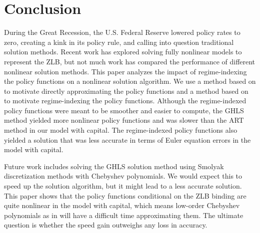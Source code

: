 \documentclass[12pt, final]{article}
\begin{document}
\section[Section 5]{Conclusion \hypertarget{Section 5}{}} 

During the Great Recession, the U.S. Federal Reserve lowered policy rates to zero, creating a kink in its policy rule, and calling into question traditional solution methods. Recent work has explored solving fully nonlinear models to represent the ZLB, but not much work has compared the performance of different nonlinear solution methods. This paper analyzes the impact of regime-indexing the policy functions on a nonlinear solution algorithm. We use a method based on \hyperlink{Atkinson}{\color{black}{Atkinson et al.\ (2019)}} to motivate directly approximating the policy functions and a method based on  \hyperlink{Gust}{\color{black}{Gust et al.\ (2017)}} to motivate regime-indexing the policy functions. Although the regime-indexed policy functions were meant to be smoother and easier to compute, the GHLS method yielded more nonlinear policy functions and was slower than the ART method in our model with capital. The regime-indexed policy functions also yielded a solution that was less accurate in terms of Euler equation errors in the model with capital. 

Future work includes solving the GHLS solution method using Smolyak discretization methods with Chebyshev polynomials. We would expect this to speed up the solution algorithm, but it might lead to a less accurate solution. This paper shows that the policy functions conditional on the ZLB binding are quite nonlinear in the model with capital, which means low-order Chebyshev polynomials as in \hyperlink{Gust}{\color{black}{Gust et al.\ (2017)}} will have a difficult time approximating them. The ultimate question is whether the speed gain outweighs any loss in accuracy.

\appendix
\end{document}
